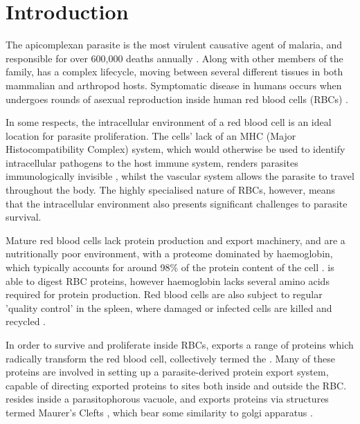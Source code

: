 \documentclass[fleqn,10pt]{article} %
\begin{document}
\section{Introduction} 

The apicomplexan parasite  is the most virulent causative agent of malaria, and responsible for over 600,000 deaths annually \cite{WorldHealthOrganisation2013}. Along with other members of the  family, \pf has a complex lifecycle, moving between several different tissues in both mammalian and arthropod hosts. Symptomatic disease in humans occurs when \pf undergoes rounds of asexual reproduction inside human red blood cells (RBCs) \cite{Chen2000}.

In some respects, the intracellular environment of a red blood cell is an ideal location for parasite proliferation. The cells' lack of an MHC (Major Histocompatibility Complex) system, which would otherwise be used to identify intracellular pathogens to the host immune system, renders parasites immunologically invisible \cite{Kirchgatter2005}, whilst the vascular system allows the parasite to travel throughout the body. The highly specialised nature of RBCs, however, means that the intracellular environment also presents significant challenges to parasite survival.

Mature red blood cells lack protein production and export machinery, and are a nutritionally poor environment, with a proteome dominated by haemoglobin, which typically accounts for around 98\% of the protein content of the cell \cite{DAlessandro2010}. \pf is able to digest RBC proteins, however haemoglobin lacks several amino acids required for protein production. Red blood cells are also  subject to regular 'quality control' in the spleen, where damaged or infected cells are killed and recycled \cite{Elsworth2014}.

In order to survive and proliferate inside RBCs, \pf exports a range of proteins which radically transform the red blood cell, collectively termed the . Many of these proteins are involved in setting up a parasite-derived protein export system, capable of directing exported \pf proteins to sites both inside and outside the RBC. \pf resides inside a parasitophorous vacuole, and exports proteins via structures termed Maurer's Clefts \cite{Marti2013}, which bear some similarity to golgi apparatus \cite{Mundwiler-Pachlatko2013}.
\end{document}
